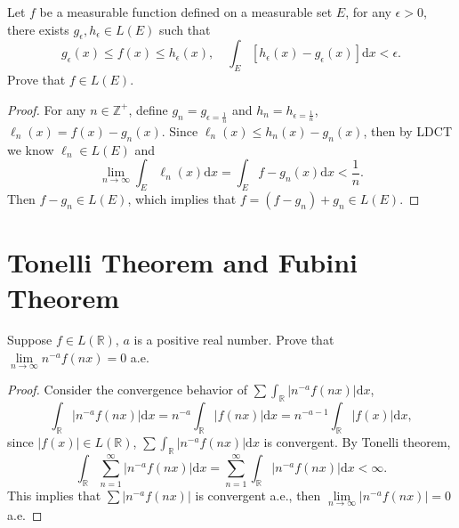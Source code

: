 \begin{exercise}{}{}
  Let $f$ be a measurable function defined on a measurable set $E$,
  for any $\epsilon > 0$, there exists $g_{\epsilon}, h_{\epsilon} \in L(E)$
  such that
  \begin{equation}
    g_{\epsilon}(x) \leq f(x) \leq h_{\epsilon}(x), \quad
    \int_E [h_{\epsilon}(x) - g_{\epsilon}(x)] \mathrm{d} x < \epsilon.
  \end{equation}
  Prove that $f \in L(E)$.
\end{exercise}

\begin{proof}
  For any $n \in \mathbb{Z}^+$, define $g_n = g_{\epsilon = \frac{1}{n}}$ and $h_n = h_{\epsilon = \frac{1}{n}}$,
  $\ell_n(x) = f(x) - g_n(x)$.
  Since $\ell_n(x) \leq h_n(x) - g_n(x)$, then by LDCT we know $\ell_n \in L(E)$ and
  \begin{equation}
    \lim \limits _{n \rightarrow \infty} \int_E \ell_n(x)\mathrm{d} x = \int_E f - g_n(x)\mathrm{d} x < \frac{1}{n}.
  \end{equation}
  Then $f - g_n \in L(E)$, which implies that $f = (f-g_n)+g_n \in L(E)$.
\end{proof}

\section{Tonelli Theorem and Fubini Theorem}

\begin{exercise}{}{}
  Suppose $f \in L(\mathbb{R})$, $a$ is a positive real number.
  Prove that $\lim \limits _{n \rightarrow \infty}  n^{-a} f(nx) = 0$ a.e.
\end{exercise}

\begin{proof}
  Consider the convergence behavior of $\sum \int_{\mathbb{R}}|n^{-a}f(nx)|\mathrm{d} x$,
  \begin{equation}
    \int_{\mathbb{R}} |n^{-a}f(nx)|\mathrm{d}x
    = n^{-a} \int_{\mathbb{R}}|f(nx)|\mathrm{d}x
    = n^{-a-1} \int_{\mathbb{R}} |f(x)|\mathrm{d} x,
  \end{equation}
 since $|f(x)| \in L(\mathbb{R})$, $\sum \int_{\mathbb{R}} |n^{-a}f(nx)|\mathrm{d} x$ is convergent.
 By Tonelli theorem,
 \begin{equation}
   \int_{\mathbb{R}} \sum\limits_{n = 1}^{\infty} |n^{-a}f(nx)|\mathrm{d}x
   = \sum\limits_{n = 1}^{\infty} \int_{\mathbb{R}} |n^{-a}f(nx)|\mathrm{d} x < \infty.
 \end{equation}
 This implies that $\sum |n^{-a}f(nx)|$ is convergent a.e.,
 then $\lim \limits _{n \rightarrow \infty} |n^{-a}f(nx)| = 0$ a.e.
\end{proof}


